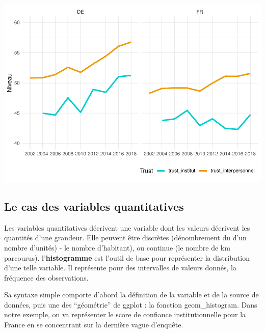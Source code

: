 \documentclass[
]{book}
\begin{document}
\includegraphics{bookdown-demo_files/figure-latex/301-1.pdf}

\hypertarget{le-cas-des-variables-quantitatives}{%
\subsection{Le cas des variables quantitatives}\label{le-cas-des-variables-quantitatives}}

Les variables quantitatives décrivent une variable dont les valeurs décrivent les quantités d'une grandeur. Elle peuvent être discrètes (dénombrement du d'un nombre d'unités) - le nombre d'habitant), ou continue (le nombre de km parcourus). l'\textbf{histogramme} est l'outil de base pour représenter la distribution d'une telle variable. Il représente pour des intervalles de valeurs donnés, la fréquence des observations.

Sa syntaxe simple comporte d'abord la définition de la variable et de la source de données, puis une des ``géométrie'' de ggplot : la fonction geom\_histogram. Dans notre exemple, on va représenter le score de confiance institutionnelle pour la France en se concentrant sur la dernière vague d'enquête.
\end{document}
